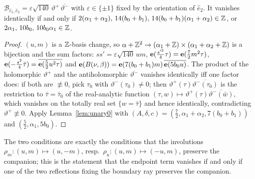 \begin{theorem}\label{thm:Bc1}
$\mathcal B_{\hat c_1,\hat e_2}=\varepsilon\sqrt{140}\,\vartheta^+\,\overline{\vartheta^-}$ with $\varepsilon\in\{\pm1\}$ fixed by the orientation of $\hat e_2$. It vanishes identically if and only
if $2(\alpha_1+\alpha_2),\,14(b_0+b_1),\,14(b_0+b_1)(\alpha_1+\alpha_2)\in\mathbb{Z}$, or $2\alpha_1,\,10b_0,\,10b_0\alpha_1\in\mathbb{Z}$.
\end{theorem}
\begin{proof}
$(u,m)$ is a $\mathbb{Z}$-basis change, so $\alpha+\mathbb{Z}^2\to(\alpha_1+\mathbb{Z})\times(\alpha_1+\alpha_2+\mathbb{Z})$ is a bijection and the sum factors: $ss'=\varepsilon\sqrt{140}\,um$,
$\mathbf{e}(\frac{s'^2}4\tau)=\mathbf{e}(\frac72m^2\tau)$, $\mathbf{e}(-\frac{s^2}4\bar\tau)=\overline{\mathbf{e}(\frac52u^2\tau)}$ and $\mathbf{e}(B(\nu,\beta))=\mathbf{e}(7(b_0+b_1)m)\,\overline{\mathbf{e}(5b_0u)}$. The product
of the holomorphic $\vartheta^+$ and the antiholomorphic $\overline{\vartheta^-}$ vanishes identically iff one factor does: if both are $\not\equiv0$, pick $\tau_0$ with
$\vartheta^-(\tau_0)\ne0$; then $\vartheta^+(\tau)\overline{\vartheta^-(\tau_0)}$ is the restriction to $\bar\tau=\bar\tau_0$ of the real-analytic function
$(\tau,w)\mapsto\vartheta^+(\tau)\overline{\vartheta^-(\bar w)}$, which vanishes on the totally real set $\{w=\bar\tau\}$ and hence identically, contradicting $\vartheta^+\not\equiv0$.
Apply Lemma~\ref{lem:unary0} with $(A,\delta,c)=(\frac72,\alpha_1+\alpha_2,7(b_0+b_1))$ and $(\frac52,\alpha_1,5b_0)$.
\end{proof}
The two conditions are exactly the conditions that the involutions $\rho_m:(u,m)\mapsto(u,-m)$, resp.\ $\rho_u:(u,m)\mapsto(-u,m)$, preserve the companion; this is the
statement that the endpoint term vanishes if and only if one of the two reflections fixing the boundary ray preserves the companion.

